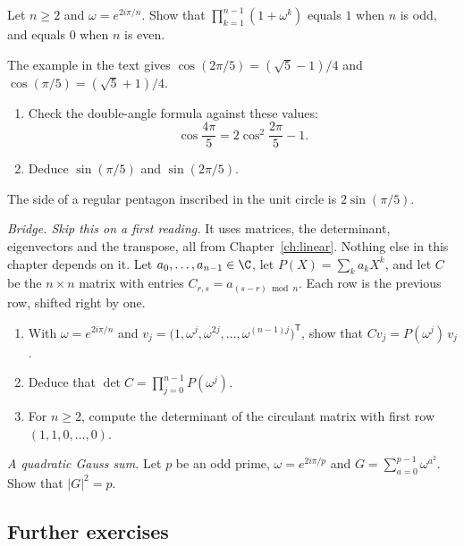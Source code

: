 \begin{exercise}[$\star\star$]\label{ex:sines}
Let $n\ge2$ and $\omega=e^{2i\pi/n}$. Show that $\prod_{k=1}^{n-1}(1+\omega^k)$ equals $1$ when $n$ is odd, and equals $0$ when $n$ is even.
\end{exercise}

\begin{exercise}[$\star\star$]\label{ex:pentagon}
The example in the text gives $\cos(2\pi/5)=(\sqrt5-1)/4$ and $\cos(\pi/5)=(\sqrt5+1)/4$.
\begin{enumerate}[label=(\alph*)]
\item Check the double-angle formula against these values:
\[
\cos\frac{4\pi}5=2\cos^2\frac{2\pi}5-1.
\]
\item Deduce $\sin(\pi/5)$ and $\sin(2\pi/5)$.
\end{enumerate}
The side of a regular pentagon inscribed in the unit circle is $2\sin(\pi/5)$.
\end{exercise}

\begin{exercise}[$\star\star\star$]\label{ex:circulant}
\emph{Bridge. Skip this on a first reading.} It uses matrices, the determinant, eigenvectors and the transpose, all from Chapter~\ref{ch:linear}. Nothing else in this chapter depends on it.
Let $a_0,\dots,a_{n-1}\in\C$, let $P(X)=\sum_ka_kX^k$, and let $C$ be the $n\times n$ matrix with entries $C_{r,s}=a_{(s-r)\bmod n}$. Each row is the previous row, shifted right by one.
\begin{enumerate}[label=(\alph*)]
\item With $\omega=e^{2i\pi/n}$ and $v_j=\bigl(1,\omega^j,\omega^{2j},\dots,\omega^{(n-1)j}\bigr)^{\mathsf T}$, show that $Cv_j=P(\omega^j)\,v_j$.
\item Deduce that $\det C=\prod_{j=0}^{n-1}P(\omega^j)$.
\item For $n\ge2$, compute the determinant of the circulant matrix with first row $(1,1,0,\dots,0)$.
\end{enumerate}
\end{exercise}

\begin{exercise}[$\star\star\star$]\label{ex:gauss}
\emph{A quadratic Gauss sum.} Let $p$ be an odd prime, $\omega=e^{2i\pi/p}$ and $G=\sum_{a=0}^{p-1}\omega^{a^2}$. Show that $|G|^2=p$.
\end{exercise}

\subsection*{Further exercises}

